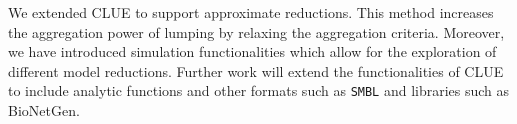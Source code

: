 
We extended CLUE\cite{ovchinnikov_clue_2021,jimenez_clue_2022} to support approximate reductions.
This method increases the aggregation power of lumping by relaxing the aggregation criteria.
Moreover, we have introduced simulation functionalities which allow for the exploration of different model reductions.
Further work will extend the functionalities of CLUE to include analytic functions and other formats such as \texttt{SMBL} and libraries such as BioNetGen.


